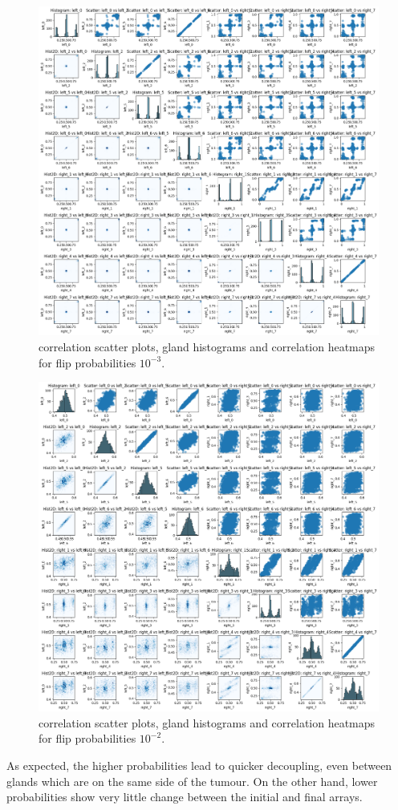 \begin{figure}[h]
    \centering
    \includegraphics[width=\textwidth]{Chapter_5/figures/sensitivity_flipprob2.png}
    \caption{correlation scatter plots, gland histograms and correlation heatmaps for flip probabilities $10^{-3}$.}
    \label{fig:sensitivity_flipprob2}
\end{figure}
\clearpage
\begin{figure}[h]
    \centering
    \includegraphics[width=\textwidth]{Chapter_5/figures/sensitivity_flipprob3.png}
    \caption{correlation scatter plots, gland histograms and correlation heatmaps for flip probabilities $10^{-2}$.}
    \label{fig:sensitivity_flipprob3}
\end{figure}
\clearpage
As expected, the higher probabilities lead to quicker decoupling, even between glands which are on the same side of the tumour. On the other hand, lower probabilities show very little change between the initial and final arrays.

